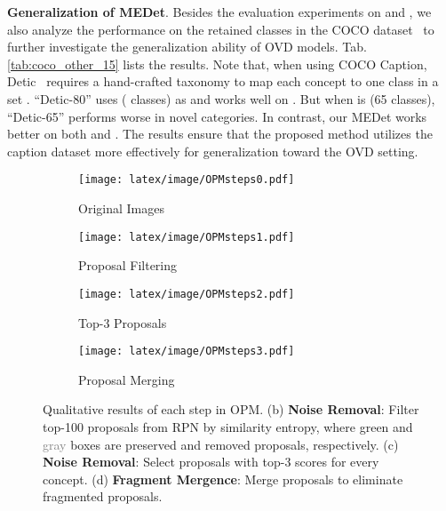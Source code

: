 \documentclass[10pt,twocolumn,letterpaper]{article}
\begin{document}
\textbf{Generalization of MEDet}.
Besides the evaluation experiments on  and , we also analyze the performance on the retained  classes  in the COCO dataset~\cite{coco_zeroshot} to further investigate the generalization ability of OVD models.
Tab.\,\ref{tab:coco_other_15} lists the results.
Note that, when using COCO Caption, Detic~\cite{detic} requires a hand-crafted taxonomy to map each concept to one class in a set .
``Detic-80'' uses  ( classes) as  
and works well on . But when  is  (65 classes), ``Detic-65'' performs worse in novel categories.
In contrast, our MEDet works better on both  and . The results ensure that the proposed method utilizes the caption dataset more effectively for generalization toward the OVD setting. 


\begin{figure*}[t]
   \centering
   \begin{subfigure}[t]{0.22\textwidth}
        \centering
        \texttt{[image: latex/image/OPMsteps0.pdf]}
        \caption{Original Images}
        \label{fig:proposal_opm_OriginalImage}
   \end{subfigure}
   \begin{subfigure}[t]{0.22\textwidth}
        \centering
        \texttt{[image: latex/image/OPMsteps1.pdf]}
        \caption{Proposal Filtering}
        \label{fig:proposal_opm_ProposalFilter}
   \end{subfigure}
   \begin{subfigure}[t]{0.22\textwidth}
        \centering
        \texttt{[image: latex/image/OPMsteps2.pdf]}
        \caption{Top-3 Proposals}
        \label{fig:proposal_opm_top3}
   \end{subfigure}
   \begin{subfigure}[t]{0.22\textwidth}
        \centering
        \texttt{[image: latex/image/OPMsteps3.pdf]}
        \caption{Proposal Merging}
        \label{fig:proposal_opm_ProposalMerge}
   \end{subfigure}
   \caption{Qualitative results of each step in OPM.
   (b) \textbf{Noise Removal}: Filter top-100 proposals from RPN by similarity entropy, where \textcolor[RGB]{153,204,153}{green} and \textcolor{gray}{gray} boxes are preserved and removed proposals, respectively.
   (c) \textbf{Noise Removal}: Select proposals with top-3  scores for every concept.
   (d) \textbf{Fragment Mergence}: Merge proposals to eliminate fragmented proposals.}
   \label{fig:proposal_opm}
\end{figure*}
\end{document}
